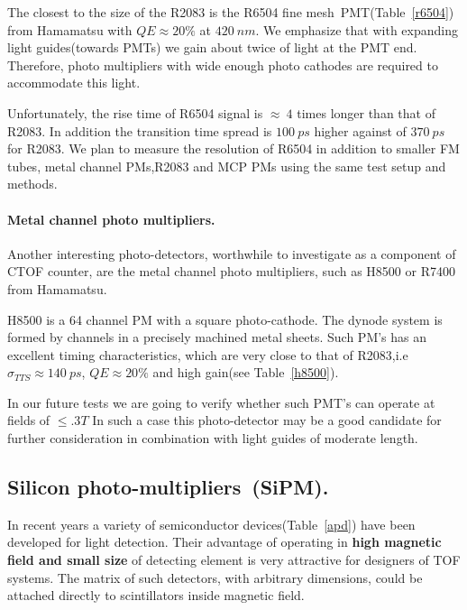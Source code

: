 

The closest to the size of the R2083  is the R6504 
fine mesh~PMT(Table~\ref{r6504}) 
from Hamamatsu with $QE\approx 20\%$ at $420~nm$.
We emphasize  that with expanding light guides(towards PMTs) we gain about twice
of light at the PMT end\cite{llg}. Therefore, photo multipliers with wide enough
 photo cathodes are required to accommodate this light.


Unfortunately, the rise time of R6504 signal 
is $\approx~4$ times longer than that of R2083.
In addition the transition time spread is  $100~ps$  higher 
against of $370~ps$ for R2083. 
We plan to measure the resolution of R6504 in addition to 
smaller FM tubes, metal channel PMs,R2083 and MCP PMs using the same test setup and methods.

\paragraph{Metal channel photo multipliers.}
Another interesting  photo-detectors,  worthwhile to  investigate as a component of CTOF counter,
 are   the metal channel photo multipliers, such as
H8500 or R7400 from Hamamatsu.

H8500 is a 64 channel PM with a square photo-cathode. 
The dynode system is formed by  channels in a precisely machined  metal sheets.
Such PM's  has an excellent timing 
 characteristics, which are very close to that of R2083,i.e 
$\sigma_{TTS}\approx140~ps$, $QE\approx20\%$ and 
 high gain(see Table~\ref{h8500}).

In our future tests we are going  to verify whether
  such PMT's can operate at fields of $\leq.3T$ 
In such a case  this photo-detector  may be  a good candidate for 
further consideration in combination with light guides of 
moderate length.  

\subsection{Silicon photo-multipliers~(SiPM).}

In recent years a variety of semiconductor devices(Table~\ref{apd}) have been developed for light detection.
Their  advantage of operating in \textbf{high magnetic field and small size} of detecting element
is very attractive for designers of TOF systems. 
The matrix of such detectors, with arbitrary dimensions,  could be attached directly to scintillators
inside magnetic field.  

